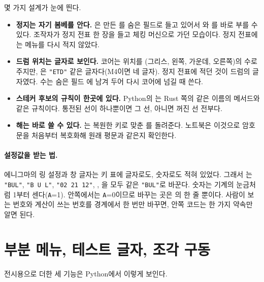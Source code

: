 몇 가지 설계가 눈에 띈다.

\begin{itemize}
\item \textbf{정지는 자기 봄베를 안다.} 은 만든 를 숨은 필드로 들고 있어서
와 를 바로 부를 수 있다. 조작자가 정지 전표 한 장을 들고 체킹 머신으로
가던 모습이다. 정지 전표에는 메뉴를 다시 적지 않았다.
\item \textbf{드럼 위치는 글자로 보인다.} 코어는 위치를 (그리스, 왼쪽, 가운데, 오른쪽)의 수로 주지만,
은 \texttt{"ETD"} 같은 글자다(M4이면 네 글자). 정지 전표에 적던 것이 드럼의 글자였다.
수는 숨은 필드 에 남겨 두어 다시 코어에 넘길 때 쓴다.
\item \textbf{스테커 후보의 규칙이 한곳에 있다.} Python의 는 Rust 쪽의
같은 이름의 메서드와 같은 규칙이다. 통전된 선이 하나뿐이면 그 선, 아니면 꺼진 선 전부다.
\item \textbf{해는 바로 쓸 수 있다.} 는 복원한 키로 맞춘 를 돌려준다.
노트북은 이것으로 암호문을 처음부터 복호화해 원래 평문과 같은지 확인한다.
\end{itemize}

\paragraph{설정값을 받는 법.} 에니그마의 링 설정과 창 글자는 키 표에 글자로도, 숫자로도 적혀 있었다. 그래서
는 \texttt{"BUL"}, \texttt{"B U L"}, \texttt{"02 21 12"}, \code{[2, 21, 12]},
\code{["B", "U", "L"]}을 모두 같은 \texttt{"BUL"}로 바꾼다. 숫자는 기계의 눈금처럼 1부터 센다(\texttt{A}=1).
안쪽에서는 \texttt{A}=0이므로 바꾸는 곳은 의 한 줄 뿐이다. 사람이 보는
번호와 계산이 쓰는 번호를 경계에서 한 번만 바꾸면, 안쪽 코드는 한 가지 약속만 알면 된다.

\section{부분 메뉴, 테스트 글자, 조각 구동}\label{sec:py-exhibit}

전시용으로 더한 세 기능은 Python에서 이렇게 보인다.

